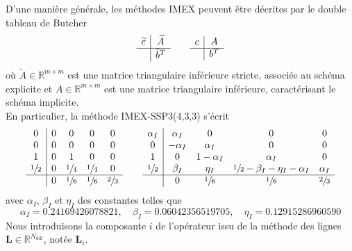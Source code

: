 \documentclass[11pt, a4paper, oneside]{report}
\begin{document}
D'une manière générale, les méthodes IMEX peuvent être décrites par le double tableau de Butcher
\begin{equation}
    \begin{array}{c|c}
        \widetilde{c} & \widetilde{A} \\
        \hline
        & \widetilde{b}^T
    \end{array} \qquad
    \begin{array}{c|c}
        c & A \\
        \hline
        & b^T        
    \end{array}
\end{equation}
où $\widetilde{A} \in \mathbb{R}^{m \times m}$ est une matrice triangulaire inférieure stricte, associée au schéma explicite et ${A \in \mathbb{R}^{m \times m}}$ est une matrice triangulaire inférieure, caractérisant le schéma implicite. \\
En particulier, la méthode IMEX-SSP3(4,3,3) s'écrit
\begin{equation}
    \begin{array}{c|cccc}
        0 & 0 & 0 & 0 & 0 \\
        0 & 0 & 0 & 0 & 0 \\
        1 & 0 & 1 & 0 & 0 \\
        \sfrac{1}{2} & 0 & \sfrac{1}{4} & \sfrac{1}{4} & 0 \\
        \hline
        & 0 & \sfrac{1}{6} & \sfrac{1}{6} & \sfrac{2}{3}
    \end{array} \qquad
    \begin{array}{c|cccc}
        \alpha_I & \alpha_I & 0 & 0 & 0 \\
        0 & -\alpha_I & \alpha_I & 0 & 0 \\
        1 & 0 & 1-\alpha_I & \alpha_I & 0 \\
        \sfrac{1}{2} & \beta_I & \eta_I & \sfrac{1}{2} - \beta_I - \eta_I - \alpha_I & \alpha_I \\
        \hline
        & 0 & \sfrac{1}{6} & \sfrac{1}{6} & \sfrac{2}{3}
    \end{array}
\end{equation}
avec $\alpha_I$, $\beta_I$ et $\eta_I$ des constantes telles que
\begin{equation}
    \alpha_I = 0.24169426078821, \quad \beta_I = 0.06042356519705, \quad \eta_I = 0.12915286960590
\end{equation}
Nous introduisons la composante $i$ de l'opérateur issu de la méthode des lignes $\bm{L} \in \mathbb{R}^{N_\text{ddl}}$, notée $\bm{L}_i$. \\
\end{document}
